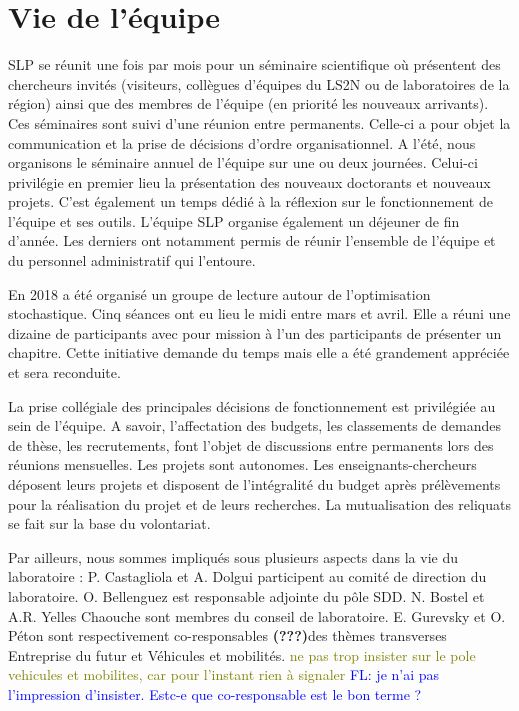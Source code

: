 \section{Vie de l'équipe}\label{slp:vieequipe}

SLP se réunit une fois par mois pour un séminaire scientifique où présentent des chercheurs invités (visiteurs, collègues d'équipes du LS2N ou de laboratoires de la région) ainsi que des membres de l'équipe (en priorité les nouveaux arrivants). 
Ces séminaires sont suivi d'une réunion entre permanents. Celle-ci a pour objet la communication et la prise de décisions d'ordre organisationnel. 
A l'été, nous organisons le séminaire annuel de l'équipe sur une ou deux journées.
Celui-ci  privilégie en premier lieu la présentation des nouveaux doctorants et nouveaux projets. C'est également un temps dédié à la réflexion sur le fonctionnement de l'équipe et ses outils.
L'équipe SLP organise également un déjeuner de fin d'année. Les derniers ont notamment permis de réunir l'ensemble de l'équipe et du personnel administratif qui l'entoure.

En 2018 a été organisé un groupe de lecture autour de l'optimisation stochastique. Cinq séances ont eu lieu le midi entre mars et avril. Elle a réuni une dizaine de participants avec pour mission à l'un des participants de présenter un chapitre. Cette initiative demande du temps mais elle a été grandement appréciée et sera reconduite.

La prise collégiale des principales décisions de fonctionnement est privilégiée au sein de l'équipe. A savoir, l'affectation des budgets, les classements de demandes de thèse, les recrutements, font l'objet de discussions entre permanents lors des réunions mensuelles. 
Les projets sont autonomes. Les enseignants-chercheurs déposent leurs projets et disposent de l'intégralité du budget après prélèvements pour la réalisation du projet et de leurs recherches. La mutualisation des reliquats se fait sur la base du volontariat.

Par ailleurs, nous sommes impliqués sous plusieurs aspects dans la vie du laboratoire :
P. Castagliola et A. Dolgui participent au comité de direction du laboratoire. 
O. Bellenguez est responsable adjointe du pôle SDD. 
N. Bostel et A.R. Yelles Chaouche sont membres du conseil de laboratoire. 
E. Gurevsky et O. Péton sont respectivement co-responsables \textbf{(???)}des thèmes transverses Entreprise du futur et Véhicules et mobilités. \textcolor{olive}{ne pas trop insister sur le pole vehicules et mobilites, car pour l'instant rien à signaler} \textcolor{blue}{FL: je n'ai pas l'impression d'insister. Estc-e que co-responsable est le bon terme ?}

